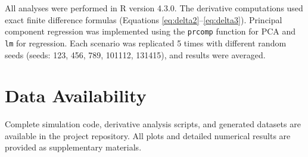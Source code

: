 \documentclass[11pt,a4paper]{article}
\begin{document}
All analyses were performed in R version 4.3.0. The derivative computations used exact finite difference formulas (Equations \eqref{eq:delta2}--\eqref{eq:delta3}). Principal component regression was implemented using the \texttt{prcomp} function for PCA and \texttt{lm} for regression. Each scenario was replicated 5 times with different random seeds (seeds: 123, 456, 789, 101112, 131415), and results were averaged.

\section{Data Availability}

Complete simulation code, derivative analysis scripts, and generated datasets are available in the project repository. All plots and detailed numerical results are provided as supplementary materials.
\end{document}
